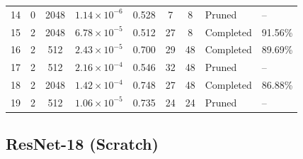 {\begin{longtable}{lccccccll}
14 & 0 & 2048 & $1.14\times10^{-6}$ & 0.528 & 7 & 8 & Pruned & -- \\
\rowcolor{gray!15} 15 & 2 & 2048 & $6.78\times10^{-5}$ & 0.512 & 27 & 8 & Completed & 91.56\% \\
16 & 2 & 512 & $2.43\times10^{-5}$ & 0.700 & 29 & 48 & Completed & 89.69\% \\
17 & 2 & 512 & $2.16\times10^{-4}$ & 0.546 & 32 & 48 & Pruned & -- \\
18 & 2 & 2048 & $1.42\times10^{-4}$ & 0.748 & 27 & 48 & Completed & 86.88\% \\
19 & 2 & 512 & $1.06\times10^{-5}$ & 0.735 & 24 & 24 & Pruned & -- \\
\end{longtable}
}

\Needspace*{0.6\textheight}
\subsection{ResNet-18 (Scratch)}

